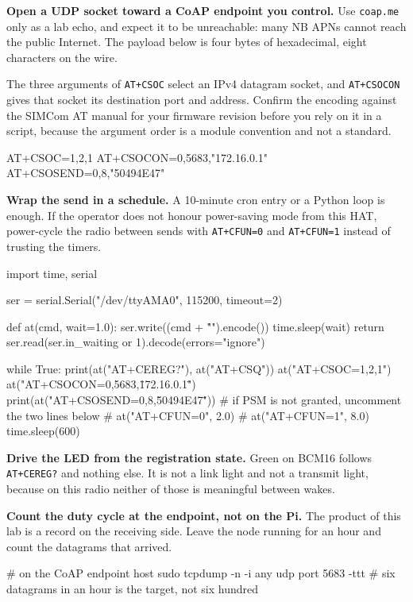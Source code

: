\begin{steps}
\item \textbf{Open a UDP socket toward a CoAP endpoint you control.} Use \texttt{coap.me} only as a lab echo, and expect it to be unreachable: many NB APNs cannot reach the public Internet. The payload below is four bytes of hexadecimal, eight characters on the wire.

The three arguments of \texttt{AT+CSOC} select an IPv4 datagram socket, and \texttt{AT+CSOCON} gives that socket its destination port and address. Confirm the encoding against the SIMCom AT manual for your firmware revision before you rely on it in a script, because the argument order is a module convention and not a standard.
\begin{atcode}
AT+CSOC=1,2,1
AT+CSOCON=0,5683,"172.16.0.1"
AT+CSOSEND=0,8,"50494E47"
\end{atcode}

\item \textbf{Wrap the send in a schedule.} A 10-minute cron entry or a Python loop is enough. If the operator does not honour power-saving mode from this HAT, power-cycle the radio between sends with \texttt{AT+CFUN=0} and \texttt{AT+CFUN=1} instead of trusting the timers.
\begin{pycode}
import time, serial

ser = serial.Serial("/dev/ttyAMA0", 115200, timeout=2)

def at(cmd, wait=1.0):
    ser.write((cmd + "\r\n").encode())
    time.sleep(wait)
    return ser.read(ser.in_waiting or 1).decode(errors="ignore")

while True:
    print(at("AT+CEREG?"), at("AT+CSQ"))
    at("AT+CSOC=1,2,1")
    at("AT+CSOCON=0,5683,\"172.16.0.1\"")
    print(at("AT+CSOSEND=0,8,\"50494E47\""))
    # if PSM is not granted, uncomment the two lines below
    # at("AT+CFUN=0", 2.0)
    # at("AT+CFUN=1", 8.0)
    time.sleep(600)
\end{pycode}

\item \textbf{Drive the LED from the registration state.} Green on BCM16 follows \texttt{AT+CEREG?} and nothing else. It is not a link light and not a transmit light, because on this radio neither of those is meaningful between wakes.

\item \textbf{Count the duty cycle at the endpoint, not on the Pi.} The product of this lab is a record on the receiving side. Leave the node running for an hour and count the datagrams that arrived.
\begin{shellcode}
# on the CoAP endpoint host
sudo tcpdump -n -i any udp port 5683 -ttt
# six datagrams in an hour is the target, not six hundred
\end{shellcode}
\end{steps}

